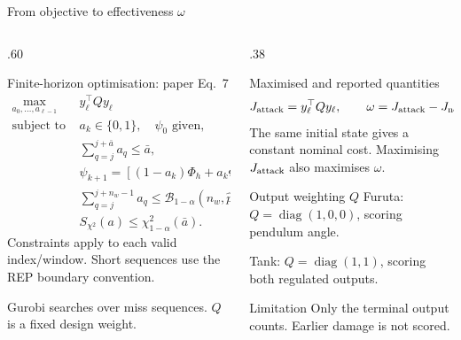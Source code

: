 \documentclass[8pt,aspectratio=169]{beamer}
\gdef\CPSOrigin{PAPER}%
\gdef\CPSSourceContext{}%
\newcommand{\src}[1][]{\gdef\CPSSourceContext{#1}}%
\begin{document}
\begin{frame}{From objective to effectiveness $\omega$}
\gdef\CPSSourceContext{}
\gdef\CPSOrigin{PAPER}
\begin{columns}[T,onlytextwidth]
\begin{column}{.60\textwidth}
\begin{block}{Finite-horizon optimisation: paper Eq.~7}
\footnotesize
\[
\begin{aligned}
\max_{a_0,\ldots,a_{\ell-1}}\quad & y_\ell^\top Qy_\ell\\
\text{subject to}\quad &a_k\in\{0,1\},\quad \psi_0\text{ given},\\
&\sum_{q=j}^{j+\bar a}a_q\le\bar a,\\
&\psi_{k+1}=[(1-a_k)\Phi_h+a_k\Phi_m]\psi_k,\\
&\sum_{q=j}^{j+n_w-1}a_q\le\mathcal B_{1-\alpha}(n_w,\hat p_m),\\
&S_{\chi^2}(a)\le\chi^2_{1-\alpha}(\bar a).
\end{aligned}
\]
Constraints apply to each valid index/window. Short sequences use the REP boundary convention.
\end{block}
\small Gurobi searches over miss sequences. $Q$ is a fixed design weight.
\end{column}
\begin{column}{.38\textwidth}
\begin{block}{Maximised and reported quantities}
\small
\[J_{\rm attack}=y_\ell^\top Qy_\ell,\qquad
\omega=J_{\rm attack}-J_{\rm nominal}.\]
The same initial state gives a constant nominal cost. Maximising $J_{\rm attack}$ also maximises $\omega$.
\end{block}
\begin{block}{Output weighting $Q$}
\small
Furuta: $Q=\operatorname{diag}(1,0,0)$, scoring pendulum angle.\par\medskip
Tank: $Q=\operatorname{diag}(1,1)$, scoring both regulated outputs.
\end{block}
\begin{alertblock}{Limitation}
\small Only the terminal output counts. Earlier damage is not scored.
\end{alertblock}
\end{column}
\end{columns}
\src[Eqs.~7, 9--11; Definition~5.1]
\end{frame}
\end{document}
